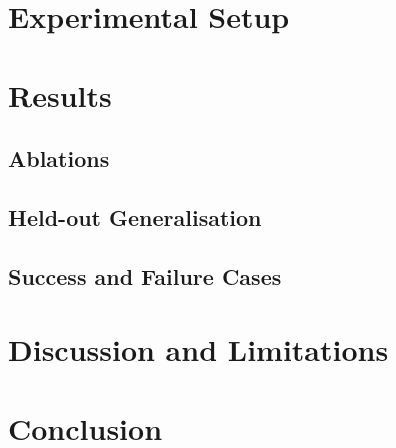 \documentclass{article}
\begin{document}
\section{Experimental Setup}

\section{Results}
% 
\subsection{Ablations}
\subsection{Held-out Generalisation}
\subsection{Success and Failure Cases}

\section{Discussion and Limitations}

\section{Conclusion}



\end{document}

